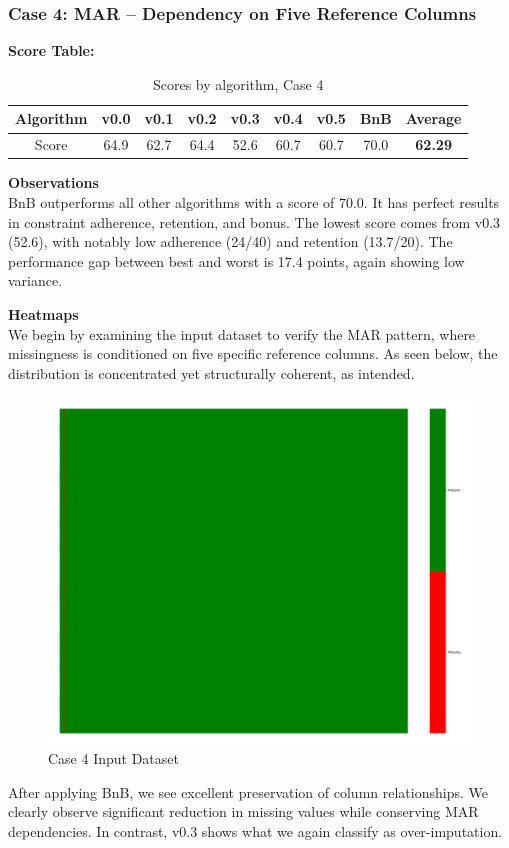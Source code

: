 \documentclass[a4paper,12pt]{article}
\begin{document}
\subsubsection{Case 4: MAR – Dependency on Five Reference Columns}

\textbf{Score Table:}

\begin{table}[H]
\centering
\caption{Scores by algorithm, Case 4}
\label{tab:score_algorithms_case4_new}
\begin{tabular}{|c|c|c|c|c|c|c|c|c|}
\hline
Algorithm & v0.0 & v0.1 & v0.2 & v0.3 & v0.4 & v0.5 & BnB & Average \\
\hline
Score & 64.9 & 62.7 & 64.4 & 52.6 & 60.7 & 60.7 & 70.0 & \textbf{62.29} \\
\hline
\end{tabular}
\end{table}

\textbf{Observations}\\
BnB outperforms all other algorithms with a score of 70.0. It has perfect results in constraint adherence, retention, and bonus. The lowest score comes from v0.3 (52.6), with notably low adherence (24/40) and retention (13.7/20). The performance gap between best and worst is 17.4 points, again showing low variance. 

\textbf{Heatmaps}\\
We begin by examining the input dataset to verify the MAR pattern, where missingness is conditioned on five specific reference columns. As seen below, the distribution is concentrated yet structurally coherent, as intended.

\begin{figure}[H]
    \centering
    \includegraphics[width=0.5\linewidth]{case4_heatmap_erased.png}
    \caption{Case 4 Input Dataset}
\end{figure}

After applying BnB, we see excellent preservation of column relationships. We clearly observe significant reduction in missing values while conserving MAR dependencies. In contrast, v0.3 shows what we again classify as over-imputation.
\end{document}
